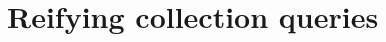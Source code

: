 \documentclass{book}
\begin{document}






\chapter{Reifying collection queries}
\label{sec:ch-aosd13}
\end{document}
